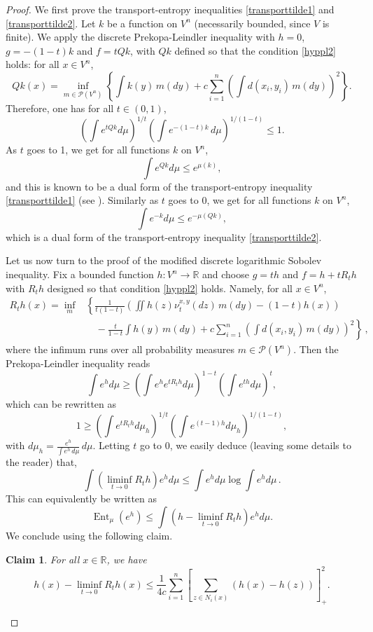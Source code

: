 \documentclass[11pt]{amsart}
\newtheorem{claim}[equation]{Claim}
\numberwithin{equation}{section}
\begin{document}
\begin{proof} 
We first prove  the transport-entropy inequalities \eqref{transporttilde1} and \eqref{transporttilde2}.
Let $k$ be a function on $V^n$ (necessarily bounded, since $V$ is finite). We apply the discrete  Prekopa-Leindler inequality with $h=0$, $g=-(1-t)k$ and $f=tQk$, with $Qk$ defined so that the condition \eqref{hyppl2} holds: for all $x\in V^n$,
$$Qk(x)=\inf_{m\in \mathcal{P}(V^n) } \left\{  \int k ( y)\,m(dy)  
  + c 
  \sum_{i=1}^n \left(\int d(x_i,y_i)\,m(dy)  \right)^2     \right\} .$$
  Therefore,  one has for all $t\in (0,1)$,
 $$\left(\int e^{tQk}d\mu\right)^{1/t}\left(\int e^{-(1-t)k}\,d\mu\right)^{1/(1-t)}\leq 1.$$
  As $t$ goes to 1, we get for all functions $k$ on $V^n$,
  $$\int e^{Qk}d\mu\leq e^{\mu(k)},$$
  and this is known to be  a dual form of the transport-entropy inequality \eqref{transporttilde1} (see \cite{GRST}).
 Similarly as $t$ goes to 0, we get for all functions $k$ on $V^n$,
  $$\int e^{-k}d\mu\leq e^{-\mu(Qk)},$$
 which is   a dual form of the transport-entropy inequality \eqref{transporttilde2}.

Let us now turn to the proof of the modified discrete logarithmic Sobolev inequality.
Fix a bounded function $h:V^n\to {\mathbb{R}}$ and choose $g=th$ and $f=h+tR_th$ with $R_t h $ designed  so that condition \eqref{hyppl2} holds.  Namely, for all $x\in V^n$, 
\begin{align*}
R_t h(x)=\inf_m& \left\{  \frac{1}{t(1-t)}\left( \iint h(z)\nu_t^{x,y}(dz)\,m(dy) - (1-t) h(x)  \right)\right.\\
& \quad-\left.   \frac{t}{1-t} \int h ( y)\,m(dy)  
  + c \sum_{i=1}^n \left(\int d(x_i,y_i)\,m(dy)  \right)^2     \right\} \,,
\end{align*}
where the infimum runs over all probability measures $m \in \mathcal{P}(V^n)$.
Then the Prekopa-Leindler inequality reads
$$\int e^h d\mu \geq \left( \int e^h e^{t R_t h} d\mu \right)^{1-t} \left( \int e^{th} d\mu \right)^t,$$
which can be rewritten as
\begin{equation*} 
1 \geq \left( \int e^{t R_t h} d\mu_h \right)^{1/t} \left( \int e^{(t-1)h} d\mu_h\right)^{1/(1-t)},
\end{equation*}
with $d\mu_h=\frac{e^h}{\int e^h\,d\mu}\,d\mu.$
Letting $t$ go to $0$, we easily deduce (leaving some details to the reader) that,
$$
\int (\liminf_{t \to 0} R_t h) e^h d\mu \leq \int e^h d\mu \log \int e^h d\mu\,.
$$
This can  equivalently  be written as
$$
{\operatorname{Ent}}_\mu (e^h) \leq \int (h - \liminf_{t \to 0} R_t h)e^h d\mu.
$$
We conclude using the following claim.
\begin{claim} \label{claim0}
For all $x \in {\mathbb{R}} $, we have
$$
h(x)-\liminf_{t \to 0} R_t h(x) \leq \frac{1}{4c}  \sum_{i=1}^n \left[\sum_{z\in N_i(x)} \left(h(x) - h(z)  \right)\right]_+^2.
$$
\end{claim}
\end{proof}
\end{document}
